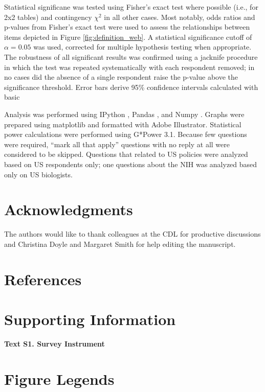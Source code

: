 \documentclass[10pt]{article}
\begin{document}
Statistical significane was tested using Fisher's exact test where possible (i.e., for 2x2 tables) and contingency $\chi^{2}$ in all other cases.
Most notably, odds ratios and p-values from Fisher's exact test were used to assess the relationships between items depicted in Figure \ref{fig:definition_web}.
A statistical significance cutoff of $\alpha=0.05$ was used, corrected for multiple hypothesis testing when appropriate.
The robustness of all significant results was confirmed using a jacknife procedure in which the test was repeated systematically with each respondent removed; in no cases did the absence of a single respondent raise the p-value above the significance threshold.
Error bars derive 95\% confidence intervals calculated with basic


Analysis was performed using IPython \cite{perez_ipython:_2007}, Pandas \cite{mckinney_data_2010}, and Numpy \cite{van_der_walt_numpy_2011}.
Graphs were prepared using matplotlib \cite{hunter_matplotlib:_2007} and formatted with Adobe Illustrator.
Statistical power calculations were performed using G*Power 3.1\cite{faul_g*_2007}.
Because few questions were required,  ``mark all that apply'' questions with no reply at all were considered to be skipped.
Questions that related to US policies were analyzed based on US respondents only; one questions about the NIH was analyzed based only on US biologists.

\section*{Acknowledgments}
The authors would like to thank colleagues at the CDL for productive discussions and Christina Doyle and Margaret Smith for help editing the manuscript.


\section*{References}



\section*{Supporting Information}
{\bf Text S1. Survey Instrument}


\section*{Figure Legends}
\end{document}
